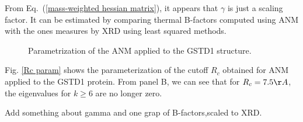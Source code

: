 From Eq.~(\ref{mass-weighted hessian matrix}), it appears that  $\gamma$ is just a scaling factor. It can be estimated by comparing thermal B-factors computed using ANM with the ones measures by XRD  using least squared methods.

\begin{figure}[h!]
	\caption{Parametrization of the ANM applied to the GSTD1 structure.}
	\label{FIG3}	
\end{figure}

Fig. \ref{Rc param} shows the parameterization of the cutoff $R_c$ obtained for ANM applied to the GSTD1 protein. From panel B, we can see that for $R_c = 7.5\AA$, the eigenvalues for $k \ge 6$ are no longer zero.

Add something about gamma and one grap of B-factors,scaled to XRD.